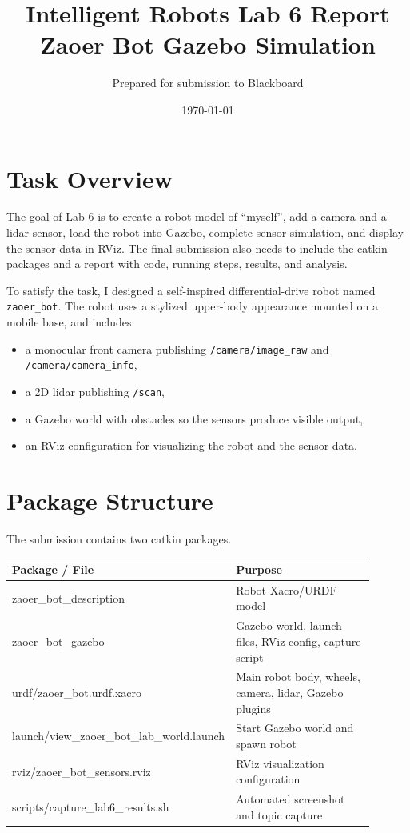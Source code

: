 \documentclass[11pt,a4paper]{article}
\title{Intelligent Robots Lab 6 Report\\Zaoer Bot Gazebo Simulation}
\author{Prepared for submission to Blackboard}
\date{\today}
\begin{document}
\maketitle
\onehalfspacing

\section{Task Overview}
The goal of Lab 6 is to create a robot model of ``myself'', add a camera and a lidar sensor, load the robot into Gazebo, complete sensor simulation, and display the sensor data in RViz. The final submission also needs to include the catkin packages and a report with code, running steps, results, and analysis.

To satisfy the task, I designed a self-inspired differential-drive robot named \texttt{zaoer\_bot}. The robot uses a stylized upper-body appearance mounted on a mobile base, and includes:

\begin{itemize}
  \item a monocular front camera publishing \texttt{/camera/image\_raw} and \texttt{/camera/camera\_info},
  \item a 2D lidar publishing \texttt{/scan},
  \item a Gazebo world with obstacles so the sensors produce visible output,
  \item an RViz configuration for visualizing the robot and the sensor data.
\end{itemize}

\section{Package Structure}
The submission contains two catkin packages.

\begin{center}
\begin{tabular}{>{\ttfamily}p{0.35\linewidth} p{0.55\linewidth}}
\toprule
Package / File & Purpose \\
\midrule
zaoer\_bot\_description & Robot Xacro/URDF model \\
zaoer\_bot\_gazebo & Gazebo world, launch files, RViz config, capture script \\
urdf/zaoer\_bot.urdf.xacro & Main robot body, wheels, camera, lidar, Gazebo plugins \\
launch/view\_zaoer\_bot\_lab\_world.launch & Start Gazebo world and spawn robot \\
rviz/zaoer\_bot\_sensors.rviz & RViz visualization configuration \\
scripts/capture\_lab6\_results.sh & Automated screenshot and topic capture \\
\bottomrule
\end{tabular}
\end{center}
\end{document}
